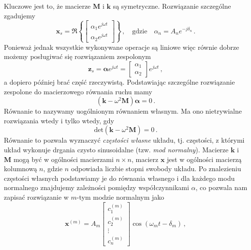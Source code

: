 \documentclass[../main.tex]{subfiles}
\begin{document}
    Kluczowe jest to, że macierze \(\mathbf{M}\) i \(\mathbf{k}\) są symetryczne. Rozwiązanie szczególne zgadujemy
    \begin{equation*}
        \mathbf{x}_s=\Re\left\{\begin{bmatrix}\alpha_1e^{j\omega t}\\\alpha_2e^{j\omega t}\end{bmatrix}\right\}\,,\quad\text{gdzie}\quad\alpha_n=A_ne^{-j\delta_n}\,.
        \end{equation*}
        Ponieważ jednak wszystkie wykonywane operacje są liniowe więc równie dobrze możemy posługiwać się rozwiązaniem zespolonym
        \begin{equation*}
            \mathbf{z}_s=\boldsymbol{\alpha}e^{j\omega t}=\begin{bmatrix}\alpha_1\\\alpha_2\end{bmatrix}e^{j\omega t}\,,
        \end{equation*}
        a dopiero później brać część rzeczywistą. Podstawiając szczególne rozwiązanie zespolone do macierzowego równania ruchu mamy
        \begin{equation*}
            (\mathbf{k}-\omega^2\mathbf{M})\boldsymbol{\alpha}=0\,.
        \end{equation*}
        Równanie to nazywamy uogólnionym równaniem własnym. Ma ono nietrywialne rozwiązania wtedy i tylko wtedy, gdy 
        \begin{equation*}
            \text{det}(\mathbf{k}-\omega^2\mathbf{M})=0\,.
        \end{equation*}
        Równanie to pozwala wyznaczyć \textit{częstości własne} układu, tj. częstości, z którymi układ wykonuje drgania czysto sinusoidalne (tzw. \textit{mod normalny}). Macierze \(\mathbf{k}\) i \(\mathbf{M}\) mogą być w ogólności macierzami \(n\times n\), macierz \(\mathbf{x}\) jest w ogólności macierzą kolumnową \(n\), gdzie \(n\) odpowiada liczbie stopni swobody układu. Po znalezieniu częstości własnych podstawiamy je do równania własnego i dla każdego modu normalnego znajdujemy zależności pomiędzy współczynnikami \(\alpha\), co pozwala nam zapisać rozwiązanie w \(m\)-tym modzie normalnym jako
        \begin{equation*}
            \mathbf{x}^{(m)}=A_m\begin{bmatrix} c_1^{(m)}\\c_2^{(m)}\\\vdots\\c_n^{(m)}\end{bmatrix}\cos(\omega_mt-\delta_m)\,,
        \end{equation*}
\end{document}
